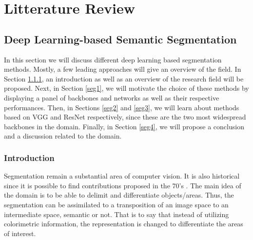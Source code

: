 
\chapter{Litterature Review} %

\label{Chapter2} %





\section{Deep Learning-based Semantic Segmentation}\label{soa-sss}

In this section we will discuss different deep learning based segmentation methods. Mostly, a few leading approaches will give an overview of the field.
In Section \ref{seg-in}, an introduction as well as an overview of the research field will be proposed.
Next, in Section \ref{seg1}, we will motivate the choice of these methods by displaying a panel of backbones and networks as well as their respective performances.
Then, in Sections \ref{seg2} and \ref{seg3}, we will learn about methods based on VGG and ResNet respectively, since these are the two most widespread backbones in the domain.
Finally, in Section \ref{seg4}, we will propose a conclusion and a discussion related to the domain.

\subsection{Introduction}\label{seg-in}

Segmentation remain a substantial area of computer vision. It is also historical since it is possible to find contributions proposed in the 70's \cite{ohta1978analysis}. The main idea of the domain is to be able to delimit and differentiate objects/areas. Thus, the segmentation can be assimilated to a transposition of an image space to an intermediate space, semantic or not. That is to say that instead of utilizing colorimetric information, the representation is changed to differentiate the areas of interest.\\



